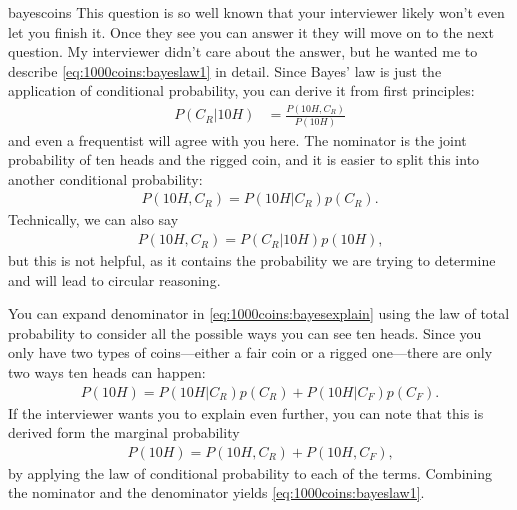 \begin{answer}{bayescoins}
This question is so well known that your interviewer likely won't even let you finish it.
Once they see you can answer it they will move on to the next question.
My interviewer didn't care about the answer, but he wanted me to describe \eqref{eq:1000coins:bayeslaw1} in detail.
Since Bayes' law is just the application of conditional probability, you can derive it from first principles:
\begin{align}
\label{eq:1000coins:bayesexplain}
 P( C_{R} \vert 10H)
 &=
 \frac{
    P( 10H , C_{R} )
 }{
    P( 10H )
 }
\end{align}
and even a frequentist will agree with you here.
The nominator is the joint probability of ten heads and the rigged coin, and it is easier to split this into another conditional probability:
\begin{align*}
    P( 10H , C_{R} )
    =
    P( 10H \vert C_{R} ) p( C_{R} )
    \text{.}
\end{align*}
Technically, we can also say
\begin{align*}
    P( 10H , C_{R} )
    =
    P( C_{R} \vert 10H  ) p( 10H  )
    \text{,}
\end{align*}
but this is not helpful, as it contains the probability we are trying to determine and will lead to circular reasoning.

You can expand denominator in
\eqref{eq:1000coins:bayesexplain}
using the law of total probability to consider all the possible ways you can see ten heads.
Since you only have two types of coins---either a fair coin or a rigged one---there are only two ways ten heads can happen:
\begin{align*}
    P( 10H ) =
    P( 10H \vert C_{R} )p(C_{R})
    +
    P( 10H \vert C_{F} )p(C_{F})
    \text{.}
\end{align*}
If the interviewer wants you to explain even further, you can note that this is derived form the marginal probability
\begin{align*}
    P( 10H ) =
    P( 10H , C_{R} )
    +
    P( 10H , C_{F} )
    \text{,}
\end{align*}
by applying the law of conditional probability to each of the terms.
Combining the nominator and the denominator yields \eqref{eq:1000coins:bayeslaw1}.


\end{answer}
